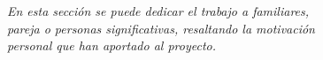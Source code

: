 

\cleardoublepage
\thispagestyle{empty}
\vspace*{0.3\textheight}

\begin{flushright}
  \itshape
  En esta sección se puede dedicar el trabajo a familiares,\\
  pareja o personas significativas, resaltando la motivación\\
  personal que han aportado al proyecto.
\end{flushright}
